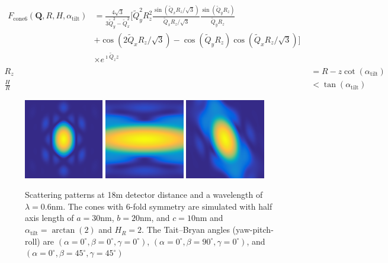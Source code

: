 \begin{align}\label{eq:opo_cone6}
\begin{split}
   F_\mathrm{cone6}(\mathbf{Q},R,H,\alpha_\mathrm{tilt})
     & = \frac{4\sqrt{3}}{3\tilde{Q}_y^2-\tilde{Q}_x^2} \Bigg[\tilde{Q}_y^2R_z^2  \frac{\sin\left(\tilde{Q}_x R_z/\sqrt{3}\right)}{\tilde{Q}_x R_z/\sqrt{3}} \frac{\sin(\tilde{Q}_y R_z)}{\tilde{Q}_y R_z} \\
     &  + \cos\left(2\tilde{Q}_x R_z/\sqrt{3}\right) -\cos(\tilde{Q}_y R_z)\cos\left(\tilde{Q}_x R_z/\sqrt{3}\right) \Bigg] \\
     & \times e^{\imath \tilde{Q}_z z}
\end{split} \\
  R_z &=R-z\cot(\alpha_\mathrm{tilt}) \\
  \frac{H}{R} &< \tan(\alpha_\mathrm{tilt})
\end{align}

\begin{figure}[htb]
\includegraphics[width=0.31\textwidth]{../images/form_factor/oriented_primitive_opbjects/cone6_0_0_0_18m.png} \hfill
\includegraphics[width=0.31\textwidth]{../images/form_factor/oriented_primitive_opbjects/cone6_0_90_0_18m.png}  \hfill \includegraphics[width=0.31\textwidth]{../images/form_factor/oriented_primitive_opbjects/cone6_0_45_45_18m.png}
\caption{Scattering patterns at 18m detector distance and a wavelength of $\lambda=0.6$nm. The cones with 6-fold symmetry are simulated with half axis length of $a=30$nm, $b=20$nm, and $c=10$nm and $\alpha_\mathrm{tilt}=\arctan(2)$ and $H_R=2$. The Tait–Bryan angles (yaw-pitch-roll) are $(\alpha=0^\circ,\beta=0^\circ,\gamma=0^\circ)$, $(\alpha=0^\circ,\beta=90^\circ,\gamma=0^\circ)$, and $(\alpha=0^\circ,\beta=45^\circ,\gamma=45^\circ)$ }
\label{fig:opo_coneIQ2D}
\end{figure}

